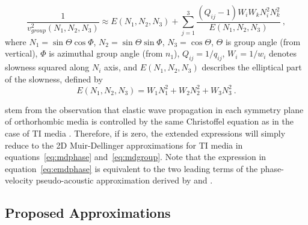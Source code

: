 \begin{equation}
\label{eq:emdgroup}
\frac{1}{v^2_{group}(N_1,N_2,N_3)} \approx  E(N_1,N_2,N_3) + \sum\limits_{j=1}^3 \frac{(Q_{ij}-1)W_iW_kN^2_{i}N^2_{k}}{E(N_1,N_2,N_3)}~,
\end{equation}
where $N_1 = \sin\Theta \cos\Phi$, $N_2 = \sin\Theta \sin\Phi$, $N_3 = \cos\Theta$, $\Theta$ is  group angle (from vertical), 
$\Phi$ is azimuthal group angle (from $n_1$), $Q_{ij} = 1/q_{ij}$,
$W_i=1/w_{i}$ denotes slowness squared along  $N_i$ axis,
and $E(N_1,N_2,N_3)$ describes the elliptical part of the slowness, defined by
\begin{equation}
E(N_1,N_2,N_3) = W_1N^2_1 + W_2N^2_2 + W_3N^2_3~.
\end{equation}

  stem from the observation that elastic wave propagation in each symmetry plane of orthorhombic media is controlled by the same Christoffel equation as in the case of TI media \cite[]{tsvankinortho,tsvankinbook}. Therefore, if   is zero, the extended expressions will simply reduce to the 2D Muir-Dellinger approximations for TI media in equations~\ref{eq:mdphase} and~\ref{eq:mdgroup}. Note that the expression in equation~\ref{eq:emdphase} is equivalent to the two leading terms of the phase-velocity pseudo-acoustic approximation derived by \cite{fowlerlapilli} and \cite{fowlerortho}.


\subsection{Proposed Approximations}

